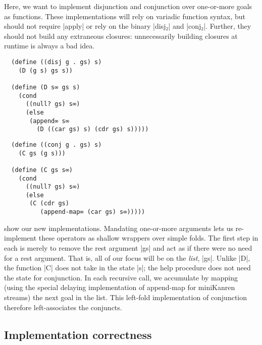 \documentclass[sigplan,screen,draft,anonymous,review,natbib=false]{acmart}
\begin{document}
Here, we want to implement disjunction and conjunction over
one-or-more goals as functions. These implementations will rely on
variadic function syntax, but should not require \rackinline|apply| or
rely on the binary \rackinline|disj₂| and \rackinline|conj₂|. Further,
they should not build any extraneous closures: unnecessarily building
closures at runtime is always a bad idea.

\begin{listing}
  \begin{verbatim}
  (define ((disj g . gs) s)
    (D (g s) gs s))

  (define (D s∞ gs s)
    (cond
      ((null? gs) s∞)
      (else
       (append∞ s∞
         (D ((car gs) s) (cdr gs) s)))))
  \end{verbatim}
  \caption{Re-implementation of \rackinline|disj|.}
  \label{mnt:disj-reimplementation}
\end{listing}

\begin{listing}
  \begin{verbatim}
  (define ((conj g . gs) s)
    (C gs (g s)))

  (define (C gs s∞)
    (cond
      ((null? gs) s∞)
      (else
       (C (cdr gs)
          (append-map∞ (car gs) s∞)))))
  \end{verbatim}
  \caption{Re-implementation of \rackinline|conj|.}
  \label{mnt:conj-reimplementation}
\end{listing}

 show our
new implementations. Mandating one-or-more arguments lets us
re-implement these operators as shallow wrappers over simple folds.
The first step in each is merely to remove the rest argument
\rackinline|gs| and act as if there were no need for a rest argument.
That is, all of our focus will be on the \emph{list}, \rackinline|gs|.
Unlike \rackinline|D|, the function \rackinline|C| does not take in
the state \rackinline|s|; the help procedure does not need the state
for conjunction. In each recursive call, we accumulate by mapping
(using the special delaying implementation of append-map for
miniKanren streams) the next goal in the list. This left-fold
implementation of conjunction therefore left-associates the conjuncts.

\subsection{Implementation correctness}
\end{document}
